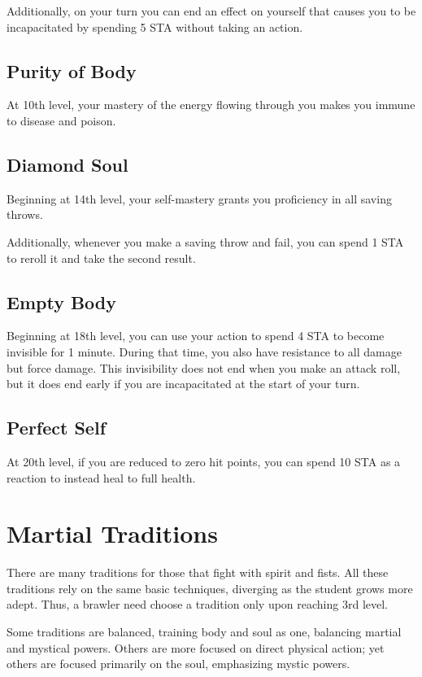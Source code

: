 Additionally, on your turn you can end an effect on yourself that causes you to be incapacitated by spending 5 STA without taking an action.

\subsection{Purity of Body}

At 10th level, your mastery of the energy flowing through you makes you immune to disease and poison.

\subsection{Diamond Soul}

Beginning at 14th level, your self-mastery grants you proficiency in all saving throws.

Additionally, whenever you make a saving throw and fail, you can spend 1 STA to reroll it and take the second result.

\subsection{Empty Body}

Beginning at 18th level, you can use your action to spend 4 STA to become invisible for 1 minute. During that time, you also have resistance to all damage but force damage. This invisibility does not end when you make an attack roll, but it does end early if you are incapacitated at the start of your turn.

\subsection{Perfect Self}

At 20th level, if you are reduced to zero hit points, you can spend 10 STA as a reaction to instead heal to full health.

\section{Martial Traditions}

There are many traditions for those that fight with spirit and fists. All these traditions rely on the same basic techniques, diverging as the student grows more adept. Thus, a brawler need choose a tradition only upon reaching 3rd level.

Some traditions are balanced, training body and soul as one, balancing martial and mystical powers. Others are more focused on direct physical action; yet others are focused primarily on the soul, emphasizing mystic powers.

